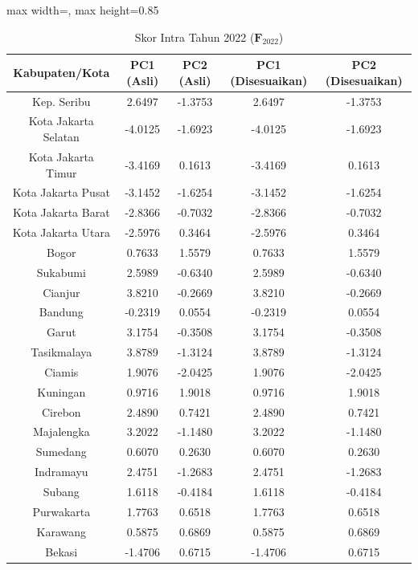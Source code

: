 \begin{table}[H]
\centering
\caption{Skor Intra Tahun 2022 ($\mathbf{F}_{2022}$)} \makeatletter{}\makeatother
\begin{adjustbox}{max width=\textwidth, max height=0.85\textheight}
\begin{tabular}{|c|c|c|c|c|}
\hline
\textbf{Kabupaten/Kota} & \textbf{PC1 (Asli)} & \textbf{PC2 (Asli)} & \textbf{PC1 (Disesuaikan)} & \textbf{PC2 (Disesuaikan)} \\
\hline
Kep. Seribu & 2.6497 & -1.3753 & 2.6497 & -1.3753 \\
Kota Jakarta Selatan & -4.0125 & -1.6923 & -4.0125 & -1.6923 \\
Kota Jakarta Timur & -3.4169 & 0.1613 & -3.4169 & 0.1613 \\
Kota Jakarta Pusat & -3.1452 & -1.6254 & -3.1452 & -1.6254 \\
Kota Jakarta Barat & -2.8366 & -0.7032 & -2.8366 & -0.7032 \\
Kota Jakarta Utara & -2.5976 & 0.3464 & -2.5976 & 0.3464 \\
Bogor & 0.7633 & 1.5579 & 0.7633 & 1.5579 \\
Sukabumi & 2.5989 & -0.6340 & 2.5989 & -0.6340 \\
Cianjur & 3.8210 & -0.2669 & 3.8210 & -0.2669 \\
Bandung & -0.2319 & 0.0554 & -0.2319 & 0.0554 \\
Garut & 3.1754 & -0.3508 & 3.1754 & -0.3508 \\
Tasikmalaya & 3.8789 & -1.3124 & 3.8789 & -1.3124 \\
Ciamis & 1.9076 & -2.0425 & 1.9076 & -2.0425 \\
Kuningan & 0.9716 & 1.9018 & 0.9716 & 1.9018 \\
Cirebon & 2.4890 & 0.7421 & 2.4890 & 0.7421 \\
Majalengka & 3.2022 & -1.1480 & 3.2022 & -1.1480 \\
Sumedang & 0.6070 & 0.2630 & 0.6070 & 0.2630 \\
Indramayu & 2.4751 & -1.2683 & 2.4751 & -1.2683 \\
Subang & 1.6118 & -0.4184 & 1.6118 & -0.4184 \\
Purwakarta & 1.7763 & 0.6518 & 1.7763 & 0.6518 \\
Karawang & 0.5875 & 0.6869 & 0.5875 & 0.6869 \\
Bekasi & -1.4706 & 0.6715 & -1.4706 & 0.6715 \\

\end{tabular}
\end{adjustbox}
\end{table}
